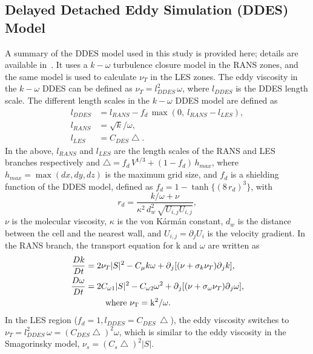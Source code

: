 \subsection{Delayed Detached Eddy Simulation (DDES) Model}
\label{sec:DDES}
%
A summary of the DDES model used in this study is provided here; details are
available in~\cite{yin2015dynamic}. It uses a $k-\omega$ turbulence closure
model in the RANS zones, and the same model is used to calculate $\nu_T$ in the
LES zones. The eddy viscosity in the $k-\omega$ DDES can be defined as
$\nu_T=l_{DDES}^2\, \omega$, where $l_{DDES}$ is the DDES length scale. The
different length scales in the $k-\omega$ DDES model are defined as
%
\begin{align}  
  l_{DDES} &=l_{RANS}-f_d\, \max( 0,~l_{RANS}-l_{LES}), \nonumber \\
  l_{RANS} &=\sqrt{k}/\omega, \\
  l_{LES} &=C_{DES}\bigtriangleup. \nonumber
  \label{eq:ddes_lscale}
\end{align}
%
In the above, $l_{RANS}$ and $l_{LES}$ are the length scales of the RANS and LES
branches respectively and $\bigtriangleup = f_d \,V^{1/3}+(1-f_d ) \,h_{max}$,
where $h_{max} = \max(dx,dy,dz)$ is the maximum grid size, and $f_d$ is a
shielding function of the DDES model, defined as $f_d = 1 -
\tanh\{(8\,r_d)^3\}$, with
\[
  r_d=\frac{k/\omega+\nu}{\kappa^2 \, d_w^2 \, \sqrt{U_{i,j} U_{i,j} }},
\]
$\nu$ is the molecular viscosity, $\kappa$ is the von K\'arm\'an constant, $d_w$ is
the distance between the cell and the nearest wall, and $U_{i,j}=\partial_j
U_i$ is the velocity gradient.  In the RANS branch, the transport equation for
k and $\omega$ are written as
%
\begin{align}  
  \frac{Dk}{Dt} & = 2\nu_T |S|^2-C_\mu k\omega+\partial{_j [(\nu+\sigma_k \nu_T ) \partial{_j k}]}, \nonumber \\
  \frac{D\omega}{Dt} & = 2C_{\omega1} |S|^2-C_{\omega2} \omega^2 
                    +\partial{_j [(\nu+\sigma_\omega \nu_T )\partial{_j \omega}]},\\
    &~~~~~~~\rm{where}~\nu_T=k^2/\omega. \nonumber
    \label{eq:transportEqs}
\end{align}  
%
In the LES region ($f_d=1,l_{DDES}=C_{DES} \, \bigtriangleup$), the eddy
viscosity switches to
$\nu_T=l_{DDES}^2\,\omega=(C_{DES}\bigtriangleup)^2\omega$, which is similar to
the eddy viscosity in the Smagorinsky model, $\nu_s=(C_s \bigtriangleup)^2
|S|$.

